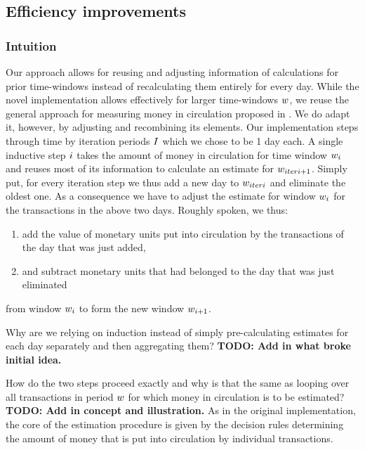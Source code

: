 \subsection{Efficiency improvements}
\label{sec:novel_impl}%

\subsubsection{Intuition}
\label{sec:novel_impl_intuition}%
Our approach allows for reusing and adjusting information of calculations for prior time-windows instead of recalculating them entirely for every day. %
While the novel implementation allows effectively for larger time-windows \({{w}}\), we reuse the general approach for measuring money in circulation proposed in \cite{pernice2019cryptocurrencies}. %
We do adapt it, however, by adjusting and recombining its elements. %
Our implementation steps through time by iteration periods \({I}\) which we chose to be 1 day each. %
A single inductive step \({i}\) takes the amount of money in circulation for time window \({w}_{i}\) and reuses most of its information to calculate an estimate for \({w}_{iteri+1}\). %
Simply put, for every iteration step we thus add a new day to \({w}_{iteri}\) and eliminate the oldest one. %
As a consequence we have to adjust the estimate for window \({w}_{i}\) for the transactions in the above two days. %
Roughly spoken, we thus:
\begin{enumerate}
\item add the value of monetary units put into circulation by the transactions of the day that was just added, %
\item and subtract monetary units that had belonged to the day that was just eliminated %
\end{enumerate}
from window \({w}_{{i}}\) to form the new window \({w}_{{i}+1}\). %

Why are we relying on induction instead of simply pre-calculating estimates for each day separately and then aggregating them? %
\textbf{TODO: Add in what broke initial idea.}

How do the two steps proceed exactly and why is that the same as looping over all transactions in period \({w}\) for which money in circulation is to be estimated?
\textbf{TODO: Add in concept and illustration.}
As in the original implementation, the core of the estimation procedure is given by the decision rules determining the amount of money that is put into circulation by individual transactions. %



